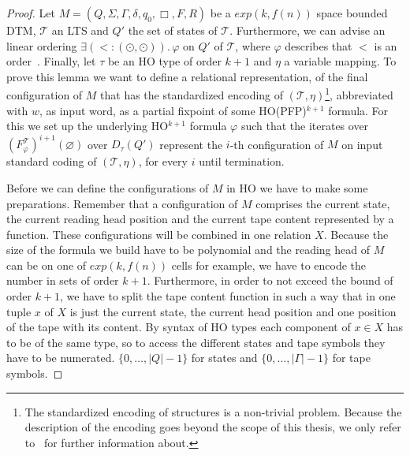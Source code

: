 \begin{proof}
    Let $M = (Q, \Sigma, \Gamma, \delta, q_0, \Box, F, R)$ be a $exp(k, f(n))$ space bounded DTM, $\mathcal{T}$ an LTS and $Q'$ the set of states of $\mathcal{T}$. Furthermore, we can advise an linear ordering $\exists (< \colon (\odot, \odot)).\, \varphi$ on $Q'$ of $\mathcal{T}$, where $\varphi$ describes that $<$ is an order~\cite{fagin1974generalized}. Finally, let $\tau$ be an HO type of
    order $k + 1$ and $\eta$ a variable mapping.
    To prove this lemma we want to define a relational representation, of the final configuration of $M$ that has the standardized encoding of $(\mathcal{T}, \eta)$\footnote{The standardized encoding of structures is a non-trivial problem. Because the description of the encoding goes beyond the scope of this thesis, we only refer to~\cite{abiteboul1995computing} for further information about.}, abbreviated with $w$, as input word,
    as a partial fixpoint of some HO(PFP)$^{k+1}$ formula. For this we set up the underlying HO$^{k+1}$ formula
    $\varphi$ such that the iterates over $(F_\varphi^\mathcal{T})^{i+1}(\varnothing)$ over $D_\tau
    (Q')$ represent the $i$-th configuration of $M$ on input standard coding of $(\mathcal{T}, \eta)$, for every $i$ until termination.

    Before we can define the configurations of $M$ in HO we have to make some preparations. Remember that a
    configuration of $M$ comprises the current state, the current reading head position and
    the current tape content represented by a function. These configurations will be combined in one relation $X$.
    Because the size of the formula we build have to be polynomial and the reading head of $M$ can be on
    one of $exp(k, f(n))$ cells for example, we have to encode the number in sets of order $k + 1$. Furthermore, in order to
    not exceed the bound of order $k + 1$, we have to split the tape content function in such a way that in one tuple
    $x$ of $X$ is just the current state, the current head position and one position of the tape with its content. By
    syntax of HO types each component of $x \in X$ has to be of the same type, so to access the different states and
    tape symbols they have to be numerated. $\{0, \dots, |Q| - 1\}$ for states and $\{0, \dots, |\Gamma| - 1\}$ for tape
    symbols.


\end{proof}
